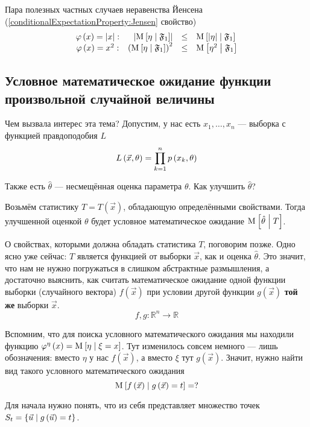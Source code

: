 Пара полезных частных случаев неравенства Йенсена
(\ref{conditionalExpectationProperty:Jensen} свойство)
$$\begin{array}{crcl}
    \varphi\left( x \right) = \left|x\right|:&
        \left| \operatorname{M}_{} \left[ \eta \;\middle|\; \mathfrak{F}_1 \right] \right|
            &\le& \operatorname{M}_{} \left[ \left| \eta \right| \;\middle|\; \mathfrak{F}_1 \right] \\
    \varphi\left( x \right) = x^2:&
        \left( \operatorname{M}_{} \left[ \eta \;\middle|\; \mathfrak{F}_1 \right] \right)^2
            &\le& \operatorname{M}_{} \left[ \eta^2 \;\middle|\; \mathfrak{F}_1 \right]
\end{array}$$

\subsection{Условное математическое ожидание функции
    произвольной случайной величины}\label{conditionalExpectationSubsection}

Чем вызвала интерес эта тема?
Допустим, у нас есть $x_1, \dots, x_n$ --- выборка с функцией правдоподобия $L$
$$L\left( \vec{x}, \theta \right) = \prod_{k=1}^n p\left(x_k, \theta\right)$$

Также есть $\hat{\theta}$ --- несмещённая оценка параметра $\theta$.
Как улучшить $\hat{\theta}$?

Возьмём статистику $T = T\left( \vec{x} \right)$,
обладающую определёнными свойствами.
Тогда улучшенной оценкой $\theta$ будет условное математическое ожидание
$\operatorname{M}_{} \left[  \hat{\theta} \;\middle|\; T  \right]$.

О свойствах, которыми должна обладать статистика $T$, поговорим позже.
Одно ясно уже сейчас: $T$ является функцией от выборки $\vec{x}$,
как и оценка $\hat{\theta}$.
Это значит, что нам не нужно погружаться в слишком абстрактные размышления,
а достаточно выяснить, как считать математическое ожидание
одной функции выборки (случайного вектора) $f\left( \vec{x} \right)$
при условии другой функции $g\left( \vec{x} \right)$
\textbf{той же} выборки $\vec{x}$.
$$f,g: \mathbb{R}^n \rightarrow \mathbb{R}$$

Вспомним, что для поиска условного математического ожидания
мы находили функцию
$\varphi^{\eta}\left( x \right) = \operatorname{M}_{} \left[  \eta \;\middle|\; \xi = x  \right]$.
Тут изменилось совсем немного --- лишь обозначения:
вместо $\eta$ у нас $f\left( \vec{x} \right)$,
а вместо $\xi$ тут $g\left( \vec{x} \right)$.
Значит, нужно найти вид такого условного математического ожидания
$$\operatorname{M}_{} \left[ f\left( \vec{x} \right) \;\middle|\; g\left( \vec{x} \right) = t \right] = ?$$

Для начала нужно понять, что из себя представляет множество точек
$S_t = \left\{ \vec{u} \;\middle|\; g\left( \vec{u} \right) = t \right\}$.

